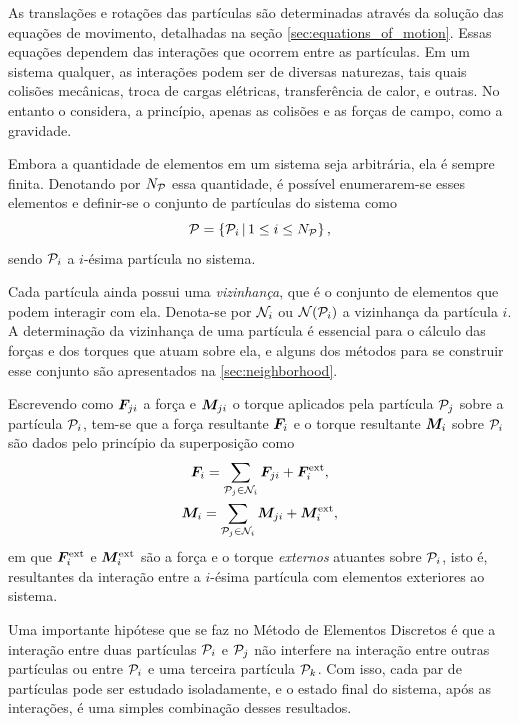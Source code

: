 As translações e rotações das partículas são determinadas através da solução das equações de movimento, detalhadas na seção \ref{sec:equations_of_motion}. Essas equações dependem das interações que ocorrem entre as partículas. Em um sistema qualquer, as interações podem ser de diversas naturezas, tais quais colisões mecânicas, troca de cargas elétricas, transferência de calor, e outras. No entanto o \DEM{} considera, a princípio, apenas as colisões e as forças de campo, como a gravidade.

Embora a quantidade de elementos em um sistema seja arbitrária, ela é sempre finita. Denotando por \(N_{\mathcal{P}}\) essa quantidade, é possível enumerarem-se esses elementos e definir-se o conjunto de partículas do sistema como
\begin{equation*}
	\particleSet = \left\lbrace\particlei \suchThat 1\leq i\leq\numberOfParticles\right\rbrace,
\end{equation*}
sendo \(\particlei\) a \(i\)-ésima partícula no sistema.

Cada partícula ainda possui uma \textit{vizinhança}, que é o conjunto de elementos que podem interagir com ela. Denota-se por \(\mathcal{N}_{i}\) ou \(\neighborhoodOf{\particlei}\) a vizinhança da partícula \(i\). A determinação da vizinhança de uma partícula é essencial para o cálculo das forças e dos torques que atuam sobre ela, e alguns dos métodos para se construir esse conjunto são apresentados na \autoref{sec:neighborhood}.

Escrevendo como \({\bm{F}}_{j i}\) a força e \({\bm{M}}_{j i}\) o torque aplicados pela partícula \(\particlej\) sobre a partícula \(\particlei\), tem-se que a força resultante \({\bm{F}}_{i}\) e o torque resultante \({\bm{M}}_{i}\) sobre \(\particlei\) são dados pelo princípio da superposição como
\begin{gather}
	\resultingForcei = \sum_{\particlej\in\ineighborhood{i}}\forceji + \external\resultingForcei, \label{eq:superposition_translation} \\
	\resultingTorquei = \sum_{\particlej\in\ineighborhood{i}}\torqueji + \external\resultingTorquei, \label{eq:superposition_rotation}
\end{gather}
em que \({\bm{F}}_{i}^{\text{ext}}\) e \({\bm{M}}_{i}^{\text{ext}}\) são a força e o torque \textit{externos} atuantes sobre \(\particlei\), isto é, resultantes da interação entre a \(i\)-ésima partícula com elementos exteriores ao sistema.

Uma importante hipótese que se faz no Método de Elementos Discretos é que a interação entre duas partículas \(\particlei\) e \(\particlej\) não interfere na interação entre outras partículas ou entre \(\particlei\) e uma terceira partícula \(\particlek\). Com isso, cada par de partículas pode ser estudado isoladamente, e o estado final do sistema, após as interações, é uma simples combinação desses resultados.

